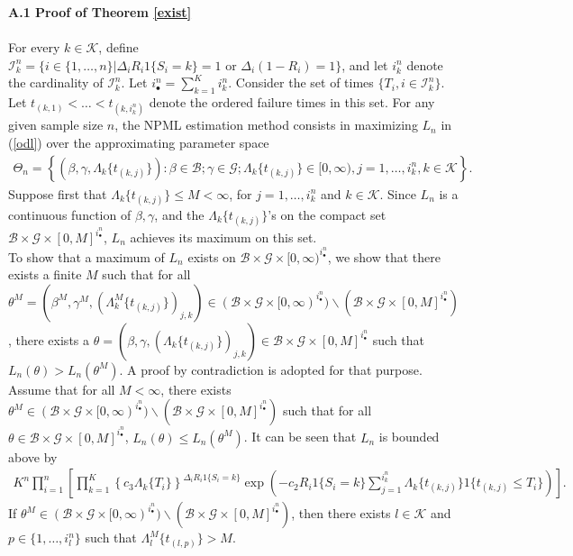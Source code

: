 \documentclass{statsoc}
\begin{document}
\textbf{A.1 Proof of Theorem \ref{exist}}
\\\\
For every $k\in\mathcal K$, define $\mathcal I_{k}^n=\{i\in\{1,\ldots,n\}|\Delta_iR_i1\{S_i=k\}=1 \mbox{ or } \Delta_i(1-R_i)=1\}$, and let $i_{k}^n$ denote the cardinality of $\mathcal I_{k}^n$. Let $i_{\bullet}^n=\sum_{k=1}^Ki_{k}^n$. Consider the set of times $\{T_i,i\in\mathcal I_k^n\}$. Let $t_{(k,1)}<\ldots<t_{(k,i^n_{k})}$ denote the ordered failure times in this set. For any given sample size $n$, the NPML estimation method consists in maximizing $L_n$ in (\ref{odl}) over the approximating parameter space 
\begin{eqnarray*}
\Theta_n=\left\{(\beta,\gamma,\Lambda_k\{t_{(k,j)}\}):\beta\in\mathcal B; \gamma\in\mathcal G; \Lambda_k\{t_{(k,j)}\}\in[0,\infty), j=1,\ldots,i_{k}^n, k\in\mathcal K\right\}.
\end{eqnarray*}
Suppose first that $\Lambda_k\{t_{(k,j)}\}\leq M<\infty$, for $j=1,\ldots,i_{k}^n$ and $k\in\mathcal K$. Since $L_n$ is a continuous function of $\beta,\gamma$, and the $\Lambda_k\{t_{(k,j)}\}$'s on the compact  set $\mathcal B\times\mathcal G\times [0,M]^{i_{\bullet}^n}$, $L_n$ achieves its maximum on this set.
\\
To show that a maximum of $L_n$ exists on $\mathcal B\times\mathcal G\times [0,\infty)^{i_{\bullet}^n}$, we show that there exists a finite $M$ such that for all $\theta^M=(\beta^M,\gamma^M,(\Lambda_k^M\{t_{(k,j)}\})_{j,k})\in(\mathcal B\times\mathcal G\times [0,\infty)^{i_{\bullet}^n})\backslash (\mathcal B\times\mathcal G\times [0,M]^{i_{\bullet}^n})$, there exists a $\theta=(\beta,\gamma,(\Lambda_k\{t_{(k,j)}\})_{j,k})\in\mathcal B\times\mathcal G\times [0,M]^{i_{\bullet}^n}$ such that $L_n(\theta)> L_n(\theta^M)$. A proof by contradiction is adopted for that purpose.
\\
Assume that for all $M<\infty$, there exists $\theta^M\in(\mathcal B\times\mathcal G\times [0,\infty)^{i_{\bullet}^n}) \backslash (\mathcal B\times\mathcal G\times [0,M]^{i_{\bullet}^n})$ such that for all $\theta\in \mathcal B\times\mathcal G\times [0,M]^{i_{\bullet}^n}$, $L_n(\theta)\leq L_n(\theta^M)$. It can be seen that $L_n$ is bounded above by
\begin{eqnarray*}
K^n\prod_{i=1}^n \left[\prod_{k=1}^K\left\{c_3\Lambda_k\{T_i\}\right\}^{\Delta_iR_i1\{S_i=k\}}\exp\left(-c_2R_i1\{S_i=k\}\sum_{j=1}^{i_{k}^n}\Lambda_k\{t_{(k,j)}\}1\{t_{(k,j)}\leq T_i\}\right)\right].
\end{eqnarray*}
If $\theta^M\in (\mathcal B\times\mathcal G\times [0,\infty)^{i_{\bullet}^n}) \backslash (\mathcal B\times\mathcal G\times [0,M]^{i_{\bullet}^n})$, then there exists $l\in\mathcal K$ and $p\in\{1,\ldots,i_l^n\}$ such that $\Lambda_l^M\{t_{(l,p)}\}>M$.
\end{document}

